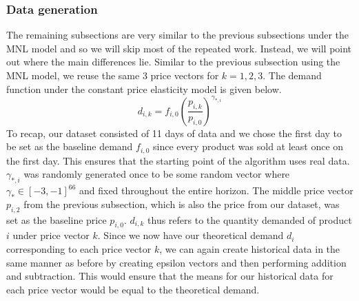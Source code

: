 \documentclass[a4paper]{article}
\begin{document}
\subsubsection{Data generation}
The remaining subsections are very similar to the previous subsections under the MNL model and so we will skip most of the repeated work. Instead, we will point out where the main differences lie.
\newline
\newline
Similar to the previous subsection using the MNL model, we reuse the same 3 price vectors for $k = 1,2,3$. The demand function under the constant price elasticity model is given below. 
\[d_{i,k} = f_{i,0} \left(\frac{p_{i,k}}{p_{i,0}}\right)^{\gamma_{*,i}} \]
To recap, our dataset consisted of 11 days of data and we chose the first day to be set as the baseline demand $f_{i,0}$ since every product was sold at least once on the first day. This ensures that the starting point of the algorithm uses real data. $\gamma_{*,i}$ was randomly generated once to be some random vector where $\gamma_* \in [-3, -1]^{66}$ and fixed throughout the entire horizon. The middle price vector $p_{i,2}$ from the previous subsection, which is also the price from our dataset, was set as the baseline price $p_{i,0}.$ $d_{i,k}$ thus refers to the quantity demanded of product $i$ under price vector $k$.
\newline
\newline
Since we now have our theoretical demand $d_i$ corresponding to each price vector $k$, we can again create historical data in the same manner as before by creating epsilon vectors and then performing addition and subtraction. This would ensure that the means for our historical data for each price vector would be equal to the theoretical demand.
\end{document}
